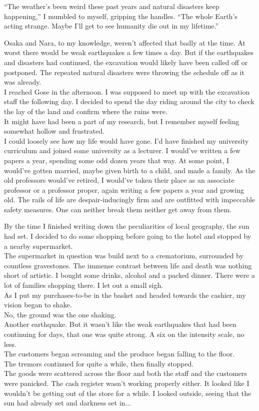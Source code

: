 ``The weather's been weird these past years and natural disasters keep happening,'' I mumbled to myself, gripping the handles. ``The whole Earth's acting strange. Maybe I'll get to see humanity die out in my lifetime.''

Osaka and Nara, to my knowledge, weren't affected that badly at the time. At worst there would be weak earthquakes a few times a day. But if the earthquakes and disasters had continued, the excavation would likely have been called off or postponed. The repeated natural disasters were throwing the schedule off as it was already.\\
I reached Gose in the afternoon. I was supposed to meet up with the excavation staff the following day. I decided to spend the day riding around the city to check the lay of the land and confirm where the ruins were.\\
It might have had been a part of my research, but I remember myself feeling somewhat hollow and frustrated.\\
I could loosely see how my life would have gone. I'd have finished my university curriculum and joined some university as a lecturer. I would've written a few papers a year, spending some odd dozen years that way. At some point, I would've gotten married, maybe given birth to a child, and made a family. As the old professors would've retired, I would've taken their place as an associate professor or a professor proper, again writing a few papers a year and growing old. The rails of life are despair-inducingly firm and are outfitted with impeccable safety measures. One can neither break them neither get away from them.

By the time I finished writing down the peculiarities of local geography, the sun had set. I decided to do some shopping before going to the hotel and stopped by a nearby supermarket. \\
The supermarket in question was build next to a crematorium, surrounded by countless gravestones. The immense contrast between life and death was nothing short of artistic. I bought some drinks, alcohol and a packed dinner. There were a lot of families shopping there. I let out a small sigh. \\
As I put my purchases-to-be in the basket and headed towards the cashier, my vision began to shake. \\
No, the ground was the one shaking. \\
Another earthquake. But it wasn't like the weak earthquakes that had been continuing for days, that one was quite strong. A six on the intensity scale, no less. \\
The customers began screaming and the produce began falling to the floor. \\
The tremors continued for quite a while, then finally stopped. \\
The goods were scattered across the floor and both the staff and the customers were panicked. The cash register wasn't working properly either. It looked like I wouldn't be getting out of the store for a while. I looked outside, seeing that the sun had already set and darkness set in... \\

